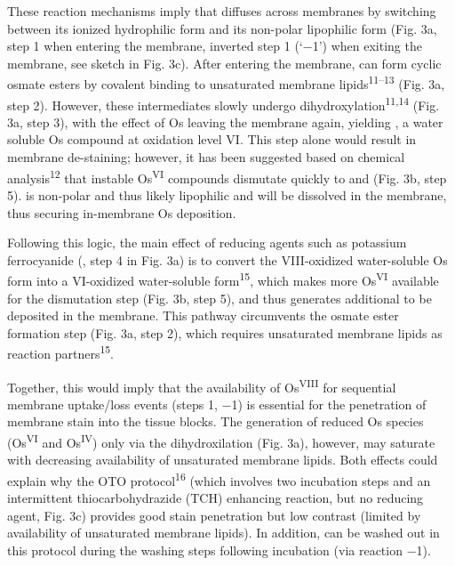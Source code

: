 \documentclass{article}
\begin{document}
These reaction mechanisms imply that  diffuses across membranes by switching between its ionized hydrophilic form  and its non-polar lipophilic form  (Fig. 3a, step 1 when entering the membrane, inverted step 1 (`−1') when exiting the membrane, see sketch in Fig. 3c). After entering the membrane,  can form cyclic osmate esters by covalent binding to unsaturated membrane lipids\textsuperscript{11–13} (Fig. 3a, step 2). However, these intermediates slowly undergo dihydroxylation\textsuperscript{11,14} (Fig. 3a, step 3), with the effect of Os leaving the membrane again, yielding , a water soluble Os compound at oxidation level VI. This step alone would result in membrane de-staining; however, it has been suggested based on chemical analysis\textsuperscript{12} that instable Os\textsuperscript{VI} compounds dismutate quickly to  and  (Fig. 3b, step 5).  is non-polar and thus likely lipophilic and will be dissolved in the membrane, thus securing in-membrane Os deposition.

Following this logic, the main effect of reducing agents such as potassium ferrocyanide (, step 4 in Fig. 3a) is to convert the VIII-oxidized water-soluble Os form into a VI-oxidized water-soluble form\textsuperscript{15}, which makes more Os\textsuperscript{VI} available for the dismutation step (Fig. 3b, step 5), and thus generates additional  to be deposited in the membrane. This pathway circumvents the osmate ester formation step (Fig. 3a, step 2), which requires unsaturated membrane lipids as reaction partners\textsuperscript{15}.

Together, this would imply that the availability of Os\textsuperscript{VIII} for sequential membrane uptake/loss events (steps 1, −1) is essential for the penetration of membrane stain into the tissue blocks. The generation of reduced Os species (Os\textsuperscript{VI} and Os\textsuperscript{IV}) only via the dihydroxilation (Fig. 3a), however, may saturate with decreasing availability of unsaturated membrane lipids. Both effects could explain why the OTO protocol\textsuperscript{16} (which involves two  incubation steps and an intermittent thiocarbohydrazide (TCH) enhancing reaction, but no reducing agent, Fig. 3c) provides good stain penetration but low contrast (limited by availability of unsaturated membrane lipids). In addition,  can be washed out in this protocol during the washing steps following  incubation (via reaction −1).
\end{document}
